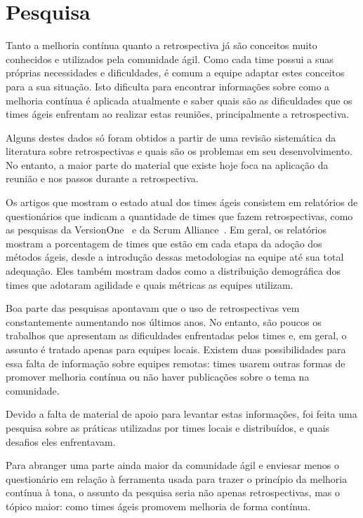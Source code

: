 \section{Pesquisa}

Tanto a melhoria contínua quanto a retrospectiva já são conceitos muito conhecidos e utilizados pela comunidade ágil. Como cada time possui a suas próprias necessidades e dificuldades, é comum a equipe adaptar estes conceitos para a sua situação. Isto dificulta para encontrar informações sobre como a melhoria contínua é aplicada atualmente e saber quais são as dificuldades que os times ágeis enfrentam ao realizar estas reuniões, principalmente a retrospectiva. 

Alguns destes dados só foram obtidos a partir de uma revisão sistemática da literatura sobre retrospectivas e quais são os problemas em seu desenvolvimento. No entanto, a maior parte do material que existe hoje foca na aplicação da reunião e nos passos durante a retrospectiva.

Os artigos que mostram o estado atual dos times ágeis consistem em relatórios de questionários que indicam a quantidade de times que fazem retrospectivas, como as pesquisas da VersionOne~\cite{versionOne} e da Scrum Alliance~\cite{scrumAlliance}. Em geral, os relatórios mostram a porcentagem de times que estão em cada etapa da adoção dos métodos ágeis, desde a introdução dessas metodologias na equipe até sua total adequação. Eles também mostram dados como a distribuição demográfica dos times que adotaram agilidade e quais métricas as equipes utilizam.

Boa parte das pesquisas apontavam que o uso de retrospectivas vem constantemente aumentando nos últimos anos. No entanto, são poucos os trabalhos que apresentam as dificuldades enfrentadas pelos times e, em geral, o assunto é tratado apenas para equipes locais. Existem duas possibilidades para essa falta de informação sobre equipes remotas: times usarem outras formas de promover melhoria contínua ou não haver publicações sobre o tema na comunidade.

Devido a falta de material de apoio para levantar estas informações, foi feita uma pesquisa sobre as práticas utilizadas por times locais e distribuídos, e quais desafios eles enfrentavam.

Para abranger uma parte ainda maior da comunidade ágil e enviesar menos o questionário em relação à ferramenta usada para trazer o princípio da melhoria contínua à tona, o assunto da pesquisa seria não apenas retrospectivas, mas o tópico maior: como times ágeis promovem melhoria de forma contínua.

